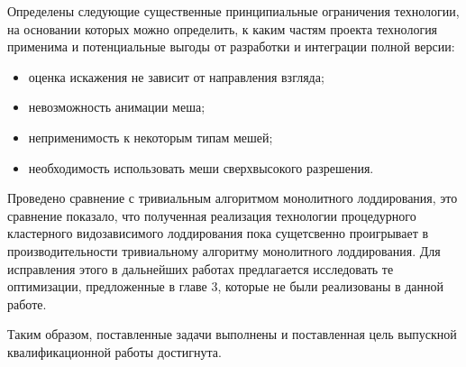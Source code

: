Определены следующие существенные принципиальные ограничения технологии, на основании которых можно определить, к каким частям проекта технология применима и потенциальные выгоды от разработки и интеграции полной версии:
\begin{itemize}
    \item оценка искажения не зависит от направления взгляда;
    \item невозможность анимации меша;
    \item неприменимость к некоторым типам мешей;
    \item необходимость использовать меши сверхвысокого разрешения.
\end{itemize}

Проведено сравнение с тривиальным алгоритмом монолитного лоддирования, это сравнение показало, что полученная реализация технологии процедурного кластерного видозависимого лоддирования пока сущетсвенно проигрывает в производительности тривиальному алгоритму монолитного лоддирования.
Для исправления этого в дальнейших работах предлагается исследовать те оптимизации, предложенные в главе 3, которые не были реализованы в данной работе.

Таким образом, поставленные задачи выполнены и поставленная цель выпускной квалификационной работы достигнута.
